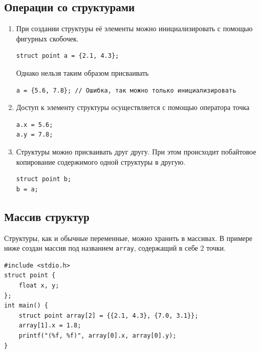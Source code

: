 \documentclass{article}
\begin{document}
\subsection*{Операции со структурами}
\begin{enumerate}
\item При создании структуры её элементы можно инициализировать с помощью фигурных скобочек.
\begin{lstlisting}
struct point a = {2.1, 4.3};
\end{lstlisting}
Однако нельзя таким образом присваивать
\begin{lstlisting}
a = {5.6, 7.8}; // Ошибка, так можно только инициализировать
\end{lstlisting}
\item Доступ к элементу структуры осуществляется с помощью оператора точка
\begin{lstlisting}
a.x = 5.6;
a.y = 7.8;
\end{lstlisting}
\item Структуры можно присваивать друг другу. При этом происходит побайтовое копирование содержимого одной структуры в другую.
\begin{lstlisting}
struct point b;
b = a;
\end{lstlisting}
\end{enumerate}

\subsection*{Массив структур}
Структуры, как и обычные переменные, можно хранить в массивах. В примере ниже создан массив под названием \texttt{array}, содержащий в себе 2 точки.
\begin{lstlisting}
#include <stdio.h>
struct point {
    float x, y;
};
int main() {
    struct point array[2] = {{2.1, 4.3}, {7.0, 3.1}};
    array[1].x = 1.8;
    printf("(%f, %f)", array[0].x, array[0].y);
}
\end{lstlisting}
\end{document}
